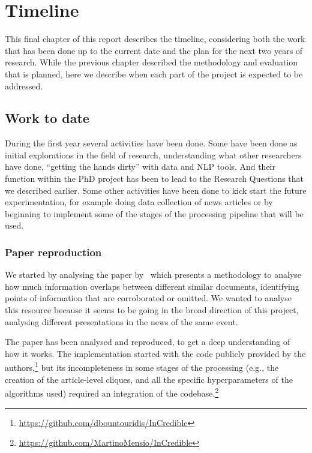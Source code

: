 \chapter{Timeline}
\label{chap:plan}

This final chapter of this report describes the timeline, considering both the work that has been done up to the current date and the plan for the next two years of research.
While the previous chapter described the methodology and evaluation that is planned, here we describe when each part of the project is expected to be addressed.

\section{Work to date}

During the first year several activities have been done.
Some have been done as initial explorations in the field of research, understanding what other researchers have done, ``getting the hands dirty'' with data and NLP tools.
And their function within the PhD project has been to lead to the Research Questions that we described earlier.
Some other activities have been done to kick start the future experimentation, for example doing data collection of news articles or by beginning to implement some of the stages of the processing pipeline that will be used.


\subsection{Paper reproduction~\cite{bountouridis2018explaining}}
We started by analysing the paper by~\citet{bountouridis2018explaining} which presents a methodology to analyse how much information overlaps between different similar documents, identifying points of information that are corroborated or omitted.
We wanted to analyse this resource because it seems to be going in the broad direction of this project, analysing different presentations in the news of the same event.

The paper has been analysed and reproduced, to get a deep understanding of how it works. The implementation started with the code publicly provided by the authors,\footnote{\url{https://github.com/dbountouridis/InCredible}} but its incompleteness in some stages of the processing (e.g., the creation of the article-level cliques, and all the specific hyperparameters of the algorithms used) required an integration of the codebase.\footnote{\url{https://github.com/MartinoMensio/InCredible}}

